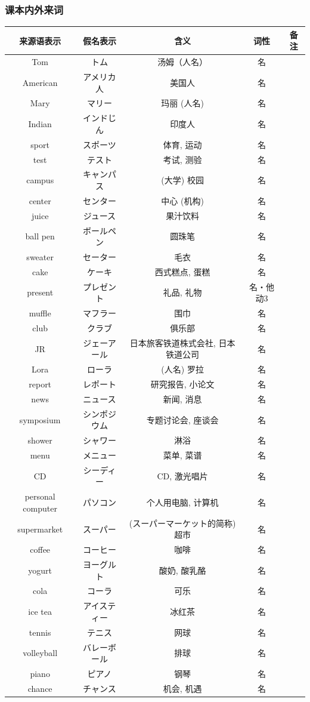 \subsubsection{课本内外来词}
\begin{longtable}{|c|c|c|c|c|}
    \hline
来源语表示 & 假名表示  & 含义 & 词性 & 备注 \\ \hline\hline   
Tom & トム  & 汤姆（人名） & 名 & \\ \hline
American & アメリカ人 &  美国人 & 名 & \\ \hline
Mary & マリー  & 玛丽 (人名) & 名 & \\ \hline
Indian & インドじん  & 印度人 & 名 & \\ \hline
sport & スポーツ & 体育, 运动 & 名 & \\ \hline
test & テスト & 考试, 测验 & 名 & \\ \hline
campus & キャンパス & (大学) 校园 & 名 & \\ \hline
center & センター & 中心 (机构) & 名 & \\ \hline
juice & ジュース & 果汁饮料 & 名 & \\ \hline
ball pen & ボールペン & 圆珠笔 & 名 & \\ \hline
sweater & セーター & 毛衣 & 名 & \\ \hline
cake & ケーキ & 西式糕点, 蛋糕 & 名 & \\ \hline
present & プレゼント & 礼品, 礼物 & 名・他动3 & \\ \hline
muffle & マフラー & 围巾 & 名 & \\ \hline
club & クラブ & 俱乐部 & 名 & \\ \hline
JR & ジェーアール & 日本旅客铁道株式会社, 日本铁道公司 & 名 & \\ \hline
Lora & ローラ & (人名) 罗拉 & 名 & \\ \hline
report & レポート & 研究报告, 小论文 & 名 & \\ \hline
news & ニュース & 新闻, 消息 & 名 & \\ \hline
symposium & シンポジウム & 专题讨论会, 座谈会 & 名 & \\ \hline
shower & シャワー & 淋浴 & 名 & \\ \hline
menu & メニュー & 菜单, 菜谱 & 名 & \\ \hline
CD & シーディー & CD, 激光唱片 & 名 & \\ \hline
personal computer & パソコン & 个人用电脑, 计算机 & 名 & \\ \hline
supermarket & スーパー & (スーパーマーケット的简称) 超市 & 名 & \\ \hline
coffee & コーヒー & 咖啡 & 名 & \\ \hline
yogurt & ヨーグルト & 酸奶, 酸乳酪 & 名 & \\ \hline
cola & コーラ & 可乐 & 名 & \\ \hline
ice tea & アイスティー & 冰红茶 & 名 & \\ \hline
tennis & テニス& 网球 & 名 & \\ \hline
volleyball & バレーボール & 排球 & 名 & \\ \hline
piano & ピアノ & 钢琴 & 名 & \\ \hline
chance & チャンス & 机会, 机遇 & 名 & \\ \hline
\end{longtable}
